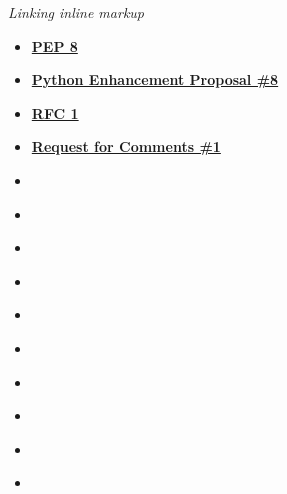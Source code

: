 \documentclass[letterpaper,10pt,english]{sphinxmanual}
\begin{document}
\emph{Linking inline markup}
\begin{itemize}
\item {} 
\href{https://www.python.org/dev/peps/pep-0008}{\textbf{PEP 8}}

\item {} 
\href{https://www.python.org/dev/peps/pep-0008}{\textbf{Python Enhancement Proposal \#8}}

\item {} 
\href{https://tools.ietf.org/html/rfc1.html}{\textbf{RFC 1}}

\item {} 
\href{https://tools.ietf.org/html/rfc1.html}{\textbf{Request for Comments \#1}}

\item {} 

\item {} 
{\hyperref[markup:with]{}}

\item {} 
{\hyperref[markup:grammar\string-token\string-try_stmt]{}}

\item {} 
{\hyperref[markup:admonition\string-section]{}}

\item {} 
{\hyperref[markup:some\string-label]{}}

\item {} 
{\hyperref[markup:some\string-label]{}}

\item {} 
{\hyperref[markup:my\string-figure]{}}

\item {} 
{\hyperref[markup:my\string-figure\string-name]{}}

\item {} 
{\hyperref[markup:my\string-table]{}}

\item {} 
{\hyperref[markup:my\string-table\string-name]{}}


\end{itemize}
\end{document}

